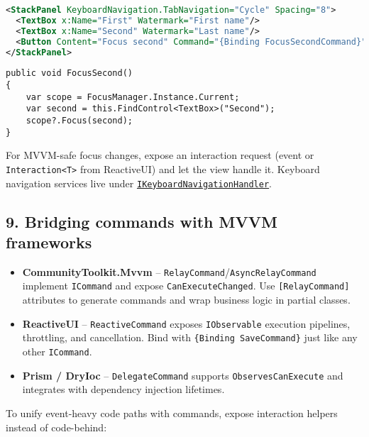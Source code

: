 \begin{lstlisting}[language=XML]
<StackPanel KeyboardNavigation.TabNavigation="Cycle" Spacing="8">
  <TextBox x:Name="First" Watermark="First name"/>
  <TextBox x:Name="Second" Watermark="Last name"/>
  <Button Content="Focus second" Command="{Binding FocusSecondCommand}"/>
</StackPanel>
\end{lstlisting}

\begin{lstlisting}
public void FocusSecond()
{
    var scope = FocusManager.Instance.Current;
    var second = this.FindControl<TextBox>("Second");
    scope?.Focus(second);
}
\end{lstlisting}

For MVVM-safe focus changes, expose an interaction request (event or
\passthrough{\lstinline!Interaction<T>!} from ReactiveUI) and let the
view handle it. Keyboard navigation services live under
\href{https://github.com/AvaloniaUI/Avalonia/blob/master/src/Avalonia.Base/Input/IKeyboardNavigationHandler.cs}{\passthrough{\lstinline!IKeyboardNavigationHandler!}}.

\subsection{9. Bridging commands with MVVM
frameworks}\label{bridging-commands-with-mvvm-frameworks}

\begin{itemize}
\tightlist
\item
  \textbf{CommunityToolkit.Mvvm} --
  \passthrough{\lstinline!RelayCommand!}/\passthrough{\lstinline!AsyncRelayCommand!}
  implement \passthrough{\lstinline!ICommand!} and expose
  \passthrough{\lstinline!CanExecuteChanged!}. Use
  \passthrough{\lstinline![RelayCommand]!} attributes to generate
  commands and wrap business logic in partial classes.
\item
  \textbf{ReactiveUI} -- \passthrough{\lstinline!ReactiveCommand!}
  exposes \passthrough{\lstinline!IObservable!} execution pipelines,
  throttling, and cancellation. Bind with
  \passthrough{\lstinline!\{Binding SaveCommand\}!} just like any other
  \passthrough{\lstinline!ICommand!}.
\item
  \textbf{Prism / DryIoc} -- \passthrough{\lstinline!DelegateCommand!}
  supports \passthrough{\lstinline!ObservesCanExecute!} and integrates
  with dependency injection lifetimes.
\end{itemize}

To unify event-heavy code paths with commands, expose interaction
helpers instead of code-behind:

